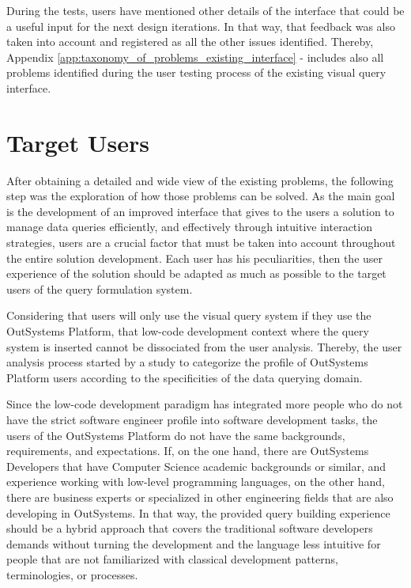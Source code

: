 During the tests, users have mentioned other details of the interface that could be a useful input for the next design iterations. In that way, that feedback was also taken into account and registered as all the other issues identified. Thereby, Appendix \ref{app:taxonomy_of_problems_existing_interface} -  includes also all problems identified during the user testing process of the existing visual query interface.

\section{Target Users}
\label{sec:target_users}

After obtaining a detailed and wide view of the existing problems, the following step was the exploration of how those problems can be solved. As the main goal is the development of an improved interface that gives to the users a solution to manage data queries efficiently, and effectively through intuitive interaction strategies, users are a crucial factor that must be taken into account throughout the entire solution development. Each user has his peculiarities, then the user experience of the solution should be adapted as much as possible to the target users of the query formulation system.

Considering that users will only use the visual query system if they use the OutSystems Platform, that low-code development context where the query system is inserted cannot be dissociated from the user analysis. Thereby, the user analysis process started by a study to categorize the profile of OutSystems Platform users according to the specificities of the data querying domain.

Since the low-code development paradigm has integrated more people who do not have the strict software engineer profile into software development tasks, the users of the OutSystems Platform do not have the same backgrounds, requirements, and expectations. If, on the one hand, there are OutSystems Developers that have Computer Science academic backgrounds or similar, and experience working with low-level programming languages, on the other hand, there are business experts or specialized in other engineering fields that are also developing in OutSystems. In that way, the provided query building experience should be a hybrid approach that covers the traditional software developers demands without turning the development and the language less intuitive for people that are not familiarized with classical development patterns, terminologies, or processes.

